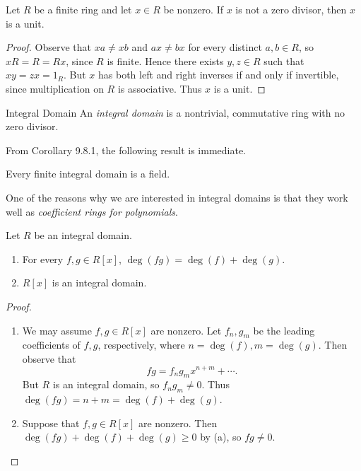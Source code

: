 \documentclass[pmath347]{subfiles}
\begin{document}
    \begin{cor}{}
        Let $R$ be a finite ring and let $x\in R$ be nonzero. If $x$ is not a zero divisor, then $x$ is a unit.
    \end{cor}	

    \begin{proof}
        Observe that $xa\neq xb$ and $ax\neq bx$ for every distinct $a,b\in R$, so $xR = R = Rx$, since $R$ is finite. Hence there exists $y,z\in R$ such that $xy=zx=1_R$. But $x$ has both left and right inverses if and only if invertible, since multiplication on $R$ is associative. Thus $x$ is a unit.
    \end{proof}

    \begin{definition}{Integral Domain}{}
        An \emph{integral domain} is a nontrivial, commutative ring with no zero divisor.
    \end{definition}

    \np From Corollary 9.8.1, the following result is immediate.

    \begin{cor}{}
        Every finite integral domain is a field.
    \end{cor}	

    \np One of the reasons why we are interested in integral domains is that they work well as \textit{coefficient rings for polynomials}.
    
    \clearpage
    \begin{prop}{}
        Let $R$ be an integral domain.
        \begin{enumerate}
            \item For every $f,g\in R\left[ x \right]$, $\deg\left( fg \right) = \deg\left( f \right) + \deg\left( g \right) $.
            \item $R\left[ x \right]$ is an integral domain.
        \end{enumerate}
    \end{prop}

    \begin{proof}
        \begin{enumerate}
            \item We may assume $f,g\in R\left[ x \right]$ are nonzero. Let $f_n, g_m$ be the leading coefficients of $f,g$, respectively, where $n=\deg\left( f \right) , m=\deg\left( g \right)$. Then observe that
                \begin{equation*}
                    fg = f_ng_mx^{n+m} + \cdots.
                \end{equation*}
                But $R$ is an integral domain, so $f_ng_m\neq 0$. Thus $\deg\left( fg \right) = n+m = \deg\left( f \right) + \deg\left( g \right)$. \qqqedsym
            \item Suppose that $f,g\in R\left[ x \right]$ are nonzero. Then $\deg\left( fg \right) + \deg\left( f \right) + \deg\left( g \right) \geq 0$ by (a), so $fg\neq 0$. \qqedsym
        \end{enumerate}
    \end{proof}
\end{document}
